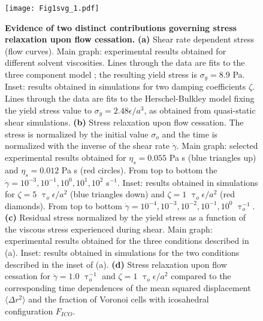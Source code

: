 \documentclass[%
preprint,
 amsmath,amssymb,
 aps,
]{revtex4-1}
\begin{document}
\begin{figure}[htbp!]
\texttt{[image: Fig1svg\_1.pdf]}
\caption{\label{Fig1_expt} {\bf Evidence of two distinct contributions governing stress relaxation upon flow cessation.
} {\bf(a)}  Shear rate dependent stress (flow curves).  Main graph: experimental results obtained for different solvent viscosities.
Lines through the data are fits to the three component model \cite{caggioni2020variations}; the resulting yield stress is $\sigma_y=8.9$ Pa. Inset: results obtained in simulations for two damping coefficients $\zeta$.
Lines through the data are fits to the Herschel-Bulkley model \cite{bonn2017yield} fixing the yield stress value to $\sigma_y=2.48 \epsilon/a^3$, as obtained from quasi-static shear simulations. {\bf(b)} Stress relaxation upon flow cessation. The stress is normalized by the initial value $\sigma_o$ and the time is normalized with the inverse of the shear rate $\dot{\gamma}$. Main graph: selected experimental results obtained for $\eta_s = 0.055$  Pa s (blue triangles up) and $\eta_s = 0.012$ Pa s  (red circles).  From top to bottom the $\dot{\gamma} = 10^{-3}, 10^{-1}, 10^{0}, 10^{1}, 10^{2}$ s$^{-1}$. Inset: results obtained in simulations for $\zeta = 5$ $\uptau_o \epsilon/a^2$  (blue triangles down) and $\zeta = 1$ $\uptau_o \epsilon/a^2$  (red diamonds). From top to bottom $\dot{\gamma} = 10^{-4}, 10^{-3}, 10^{-2}, 10^{-1}, 10^{0}$ $\uptau_o^{-1}$. {\bf(c)} Residual stress normalized by the yield stress as a function of the viscous stress experienced during shear.  Main graph: experimental results obtained for the three conditions described in (a). Inset: results obtained in simulations for the two conditions described in the inset of (a).  {\bf (d)} 
Stress relaxation upon flow cessation for $\dot{\gamma} = 1.0$ $\uptau_o^{-1}$ and $\zeta = 1$ $\uptau_o \epsilon/a^2$ compared to the corresponding time dependences of the mean squared displacement $\langle\Delta r^2\rangle$ and the fraction of Voronoi cells with icosahedral configuration $F_{ICO}$.}
\end{figure}
\end{document}
